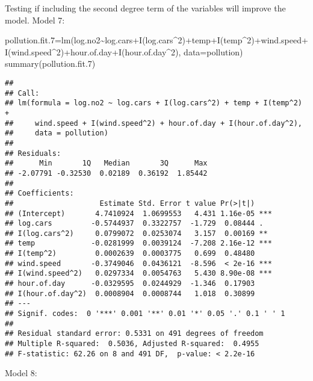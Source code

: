 \documentclass[
]{article}
\newenvironment{Shaded}{\begin{snugshade}}{\end{snugshade}}
\newcommand{\AttributeTok}[1]{\textcolor[rgb]{0.77,0.63,0.00}{#1}}
\newcommand{\DecValTok}[1]{\textcolor[rgb]{0.00,0.00,0.81}{#1}}
\newcommand{\FloatTok}[1]{\textcolor[rgb]{0.00,0.00,0.81}{#1}}
\newcommand{\FunctionTok}[1]{\textcolor[rgb]{0.00,0.00,0.00}{#1}}
\newcommand{\NormalTok}[1]{#1}
\newcommand{\OtherTok}[1]{\textcolor[rgb]{0.56,0.35,0.01}{#1}}
\newcommand{\SpecialCharTok}[1]{\textcolor[rgb]{0.00,0.00,0.00}{#1}}
\begin{document}
Testing if including the second degree term of the variables will
improve the model. Model 7:

\begin{Shaded}
\begin{Highlighting}[]
\NormalTok{pollution.fit}\FloatTok{.7}\OtherTok{=}\FunctionTok{lm}\NormalTok{(log.no2}\SpecialCharTok{\textasciitilde{}}\NormalTok{log.cars}\SpecialCharTok{+}\FunctionTok{I}\NormalTok{(log.cars}\SpecialCharTok{\^{}}\DecValTok{2}\NormalTok{)}\SpecialCharTok{+}\NormalTok{temp}\SpecialCharTok{+}\FunctionTok{I}\NormalTok{(temp}\SpecialCharTok{\^{}}\DecValTok{2}\NormalTok{)}\SpecialCharTok{+}\NormalTok{wind.speed}\SpecialCharTok{+}\FunctionTok{I}\NormalTok{(wind.speed}\SpecialCharTok{\^{}}\DecValTok{2}\NormalTok{)}\SpecialCharTok{+}\NormalTok{hour.of.day}\SpecialCharTok{+}\FunctionTok{I}\NormalTok{(hour.of.day}\SpecialCharTok{\^{}}\DecValTok{2}\NormalTok{), }\AttributeTok{data=}\NormalTok{pollution)}
\FunctionTok{summary}\NormalTok{(pollution.fit}\FloatTok{.7}\NormalTok{)}
\end{Highlighting}
\end{Shaded}

\begin{verbatim}
## 
## Call:
## lm(formula = log.no2 ~ log.cars + I(log.cars^2) + temp + I(temp^2) + 
##     wind.speed + I(wind.speed^2) + hour.of.day + I(hour.of.day^2), 
##     data = pollution)
## 
## Residuals:
##      Min       1Q   Median       3Q      Max 
## -2.07791 -0.32530  0.02189  0.36192  1.85442 
## 
## Coefficients:
##                    Estimate Std. Error t value Pr(>|t|)    
## (Intercept)       4.7410924  1.0699553   4.431 1.16e-05 ***
## log.cars         -0.5744937  0.3322757  -1.729  0.08444 .  
## I(log.cars^2)     0.0799072  0.0253074   3.157  0.00169 ** 
## temp             -0.0281999  0.0039124  -7.208 2.16e-12 ***
## I(temp^2)         0.0002639  0.0003775   0.699  0.48480    
## wind.speed       -0.3749046  0.0436121  -8.596  < 2e-16 ***
## I(wind.speed^2)   0.0297334  0.0054763   5.430 8.90e-08 ***
## hour.of.day      -0.0329595  0.0244929  -1.346  0.17903    
## I(hour.of.day^2)  0.0008904  0.0008744   1.018  0.30899    
## ---
## Signif. codes:  0 '***' 0.001 '**' 0.01 '*' 0.05 '.' 0.1 ' ' 1
## 
## Residual standard error: 0.5331 on 491 degrees of freedom
## Multiple R-squared:  0.5036, Adjusted R-squared:  0.4955 
## F-statistic: 62.26 on 8 and 491 DF,  p-value: < 2.2e-16
\end{verbatim}

Model 8:
\end{document}
